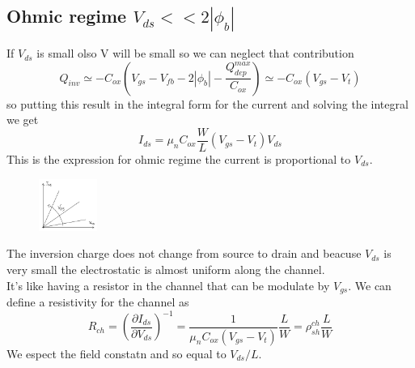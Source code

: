 \subsection{Ohmic regime $V_{ds}<<2|\phi_b|$}
If $V_{ds}$ is small olso V will be small so we can neglect that contribution 
\begin{equation}
Q_{inv}\simeq -C_{ox}(V_{gs}-V_{fb}-2|\phi_b|-\frac{Q_{dep}^{max}}{C_{ox}})\simeq -C_{ox}(V_{gs}-V_t)
\end{equation}
so putting this result in the integral form for the current and solving the integral we get
\begin{equation}
I_{ds}=\mu_nC_{ox}\frac{W}{L}(V_{gs}-V_t)V_{ds}
\end{equation}
This is the expression for ohmic regime the current is proportional to $V_{ds}$.\\
\begin{figure}
\includegraphics[width=0.17\textwidth]{ohmreg.png}
\end{figure}

The inversion charge does not change from source to drain and beacuse $V_{ds}$ is very small the electrostatic is almost uniform along the channel.\\

It's like having a resistor in the channel that can be modulate by $V_{gs}$. We can define a resistivity for the channel as 
\begin{equation}
R_{ch}=(\frac{\partial I_{ds}}{\partial V_{ds}})^{-1}=\frac{1}{\mu_nC_{ox}(V_{gs}-V_{t})}\frac{L}{W}=\rho_{sh}^{ch}\frac{L}{W}
\end{equation}
We espect the field constatn and so equal to $V_{ds}/L$.\\

